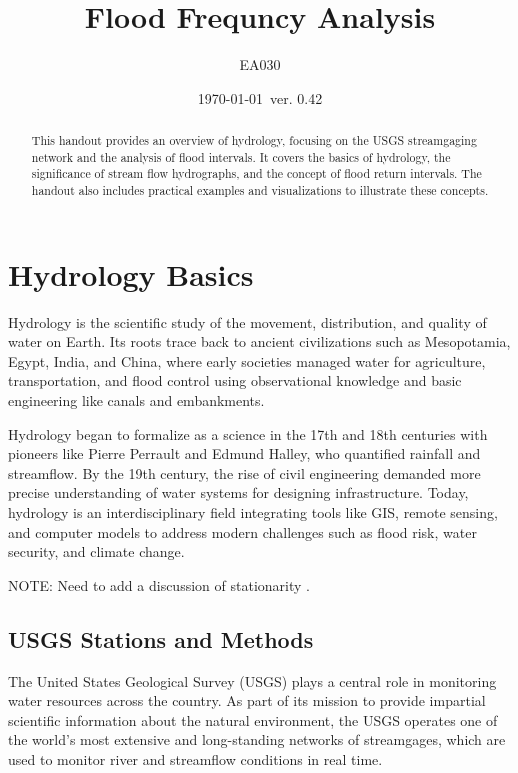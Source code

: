 \documentclass{tufte-handout}\usepackage[]{graphicx}\usepackage[]{xcolor}
\title{Flood Frequncy Analysis}
\author{EA030}
\date{\today~ver. 0.42}
\begin{document}
\maketitle%
\begin{abstract}
\noindent 
This handout provides an overview of hydrology, focusing on the USGS streamgaging network and the analysis of flood intervals. It covers the basics of hydrology, the significance of stream flow hydrographs, and the concept of flood return intervals. The handout also includes practical examples and visualizations to illustrate these concepts.
\end{abstract}



\section{Hydrology Basics}

Hydrology is the scientific study of the movement, distribution, and quality of water on Earth. Its roots trace back to ancient civilizations such as Mesopotamia, Egypt, India, and China, where early societies managed water for agriculture, transportation, and flood control using observational knowledge and basic engineering like canals and embankments.

Hydrology began to formalize as a science in the 17th and 18th centuries with pioneers like Pierre Perrault and Edmund Halley, who quantified rainfall and streamflow. By the 19th century, the rise of civil engineering demanded more precise understanding of water systems for designing infrastructure. Today, hydrology is an interdisciplinary field integrating tools like GIS, remote sensing, and computer models to address modern challenges such as flood risk, water security, and climate change.

NOTE: Need to add a discussion of stationarity \citep{merz2021causes,shao2024research, pielke2009collateral}.

\subsection{USGS Stations and Methods}

The United States Geological Survey (USGS) plays a central role in monitoring water resources across the country. As part of its mission to provide impartial scientific information about the natural environment, the USGS operates one of the world’s most extensive and long-standing networks of streamgages, which are used to monitor river and streamflow conditions in real time.
\end{document}
